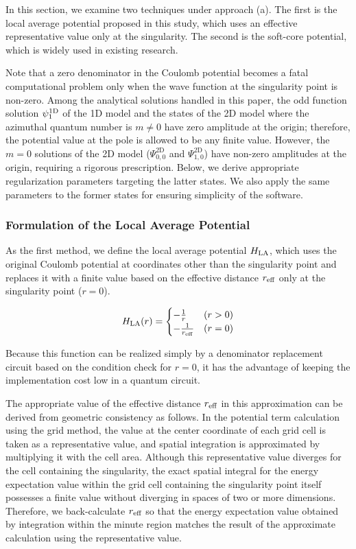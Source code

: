\documentclass[aip-draft.tex]{subfiles}
\begin{document}
In this section, we examine two techniques under approach (a). The first is the
local average potential proposed in this study, which uses an effective
representative value only at the singularity. The second is the soft-core
potential, which is widely used in existing research.

Note that a zero denominator in the Coulomb potential becomes a fatal
computational problem only when the wave function at the singularity point is
non-zero. Among the analytical solutions handled in this paper, the odd function
solution $\psi^{\mathrm{1D}}_1$ of the 1D model and the states of the 2D model where the
azimuthal quantum number is $m \neq 0$ have zero amplitude at the origin;
therefore, the potential value at the pole is allowed to be any finite value.
However, the $m=0$ solutions of the 2D model ($\Psi_{0,0}^{\mathrm{2D}}$ and
$\Psi_{1,0}^{\mathrm{2D}}$) have non-zero amplitudes at the origin, requiring a
rigorous prescription. Below, we derive appropriate regularization parameters
targeting the latter states.  We also apply the same parameters to the former
states for ensuring simplicity of the software.

\subsubsection{Formulation of the Local Average Potential}
\label{subsubsec:formulation-of-local-average-potential}

As the first method, we define the local average potential $H_{\mathrm{LA}}$, which uses
the original Coulomb potential at coordinates other than the singularity point
and replaces it with a finite value based on the effective distance $r_{\mathrm{eff}}$ only
at the singularity point ($r=0$).

\begin{equation}
H_{\mathrm{LA}}(r) = \begin{cases}
-\frac{1}{r} & (r>0) \\
-\frac{1}{r_{\mathrm{eff}}} & (r=0)
\end{cases}\label{eq:Halr}
\end{equation}

Because this function can be realized simply by a denominator replacement
circuit based on the condition check for $r=0$, it has the advantage of keeping
the implementation cost low in a quantum circuit.

The appropriate value of the effective distance $r_{\mathrm{eff}}$ in this approximation
can be derived from geometric consistency as follows. In the potential term
calculation using the grid method, the value at the center coordinate of each
grid cell is taken as a representative value, and spatial integration is
approximated by multiplying it with the cell area. Although this representative
value diverges for the cell containing the singularity, the exact spatial
integral for the energy expectation value within the grid cell containing the
singularity point itself possesses a finite value without diverging in spaces of
two or more dimensions. Therefore, we back-calculate $r_{\mathrm{eff}}$ so that the energy
expectation value obtained by integration within the minute region matches the
result of the approximate calculation using the representative value.
\end{document}
